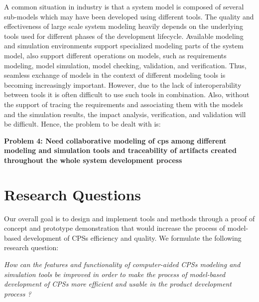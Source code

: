 A common situation in industry is that a system model is composed of several sub-models which may have been developed using different tools. The quality and effectiveness of large scale system modeling heavily depends on the underlying tools used for different phases of the development lifecycle. Available modeling and simulation environments support specialized modeling parts of the system model, also support different operations on models, such as requirements modeling, model simulation, model checking, validation, and verification. Thus, seamless exchange of models in the context of different modeling tools is becoming increasingly important. However, due to the lack of interoperability between tools it is often difficult to use such tools in combination. Also, without the support of tracing the requirements and associating them with the models and the simulation results, the impact analysis, verification, and validation will be difficult. Hence, the problem to be dealt with is:

\begin{description}

\item \textbf{Problem 4: Need collaborative modeling of \acrshort{cps} among different modeling and simulation tools and traceability of artifacts created throughout the whole system development process}

\end{description}


\section{Research Questions}
\label{sec:Research Questions}

Our overall goal is to design and implement tools and methods through a proof of concept and prototype demonstration that would increase the process of model-based development of CPSs efficiency and quality. We formulate the following research question:

\textit{How can the features and functionality of computer-aided CPSs modeling and simulation tools be improved in order to make the process of model-based development of CPSs more efficient and usable in the product development process ? } 


